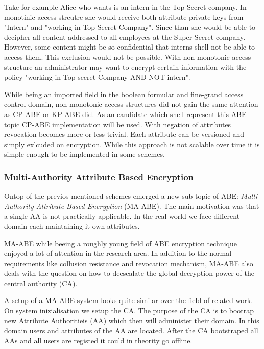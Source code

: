 Take for example Alice who wants is an intern in the Top Secret company. In monotinic access strcutre she would receive both attribute private keys from "Intern" and "working in Top Secret Company". Since than she would be able to decipher all content addressed to all employees at the Super Secret company. However, some content might be so confidential that interns shell not be able to access them. This exclusion would not be possible. With non-monotonic access structure an administrator may want to encrypt certain information with the policy "working in Top secret Company AND NOT intern".  

While being an imported field in the boolean formular and fine-grand access control domain, non-monotonic access structures did not gain the same attention as \ac{CP-ABE} or \ac{KP-ABE} did. As an candidate which shell represent this \ac{ABE} topic \cite{10.1007/978-3-642-54631-0_16} \ac{CP-ABE} implementation will be used. With negation of attributes revocation becomes more or less trivial. Each attribute can be versioned and simply exlcuded on encryption. While this approach is not scalable over time it is simple enough to be implemented in some schemes.   

\subsubsection{Multi-Authority Attribute Based Encryption}
Ontop of the previos mentioned schemes emerged a new sub topic of \ac{ABE}: \textit{Multi-Authority Attribute Based Encryption} (\ac{MA-ABE}). The main motivation was that a single \ac{AA} is not practically applicable. In the real world we face different domain each maintaining it own attributes. 

\ac{MA-ABE} while beeing a roughly young field of \ac{ABE} encryption technique enjoyed a lot of attention in the research area. In addition to the normal requirements like collusion resistance and revocation mechanism, \ac{MA-ABE} also deals with the question on how to deescalate the global decryption power of the central authority (\ac{CA}). 

A setup of a \ac{MA-ABE} system looks quite similar over the field of related work. On system inizialisation we setup the \ac{CA}. The purpose of the \ac{CA} is to bootrap new Attribute Authoritieis (\ac{AA}) which then will administer their domain. In this domain users and attributes of the \ac{AA} are located. After the \ac{CA} bootstraped all \ac{AA}s and all users are registed it could in theority go offline. 

